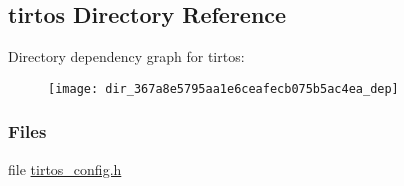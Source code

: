 \subsection{tirtos Directory Reference}
\label{dir_367a8e5795aa1e6ceafecb075b5ac4ea}
Directory dependency graph for tirtos\+:
\nopagebreak
\begin{figure}[H]
\begin{center}
\leavevmode
\texttt{[image: dir\_367a8e5795aa1e6ceafecb075b5ac4ea\_dep]}
\end{center}
\end{figure}
\subsubsection*{Files}
\begin{DoxyCompactItemize}
\item 
file \hyperlink{tirtos__config_8h}{tirtos\+\_\+config.\+h}
\end{DoxyCompactItemize}
